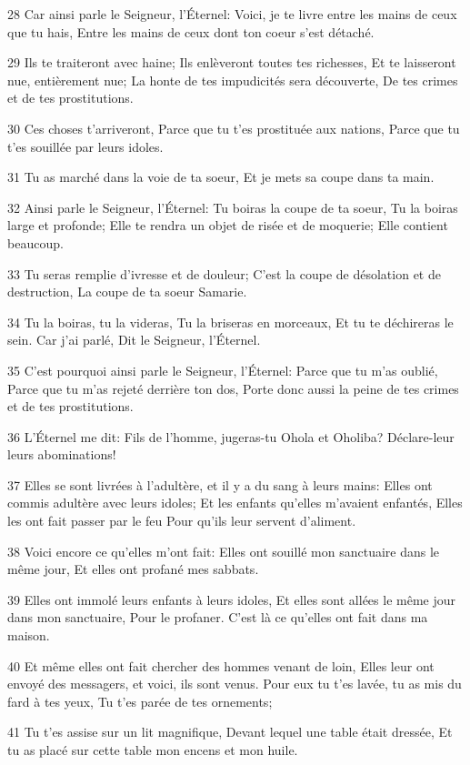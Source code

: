 \par 28 Car ainsi parle le Seigneur, l'Éternel: Voici, je te livre entre les mains de ceux que tu hais, Entre les mains de ceux dont ton coeur s'est détaché.
\par 29 Ils te traiteront avec haine; Ils enlèveront toutes tes richesses, Et te laisseront nue, entièrement nue; La honte de tes impudicités sera découverte, De tes crimes et de tes prostitutions.
\par 30 Ces choses t'arriveront, Parce que tu t'es prostituée aux nations, Parce que tu t'es souillée par leurs idoles.
\par 31 Tu as marché dans la voie de ta soeur, Et je mets sa coupe dans ta main.
\par 32 Ainsi parle le Seigneur, l'Éternel: Tu boiras la coupe de ta soeur, Tu la boiras large et profonde; Elle te rendra un objet de risée et de moquerie; Elle contient beaucoup.
\par 33 Tu seras remplie d'ivresse et de douleur; C'est la coupe de désolation et de destruction, La coupe de ta soeur Samarie.
\par 34 Tu la boiras, tu la videras, Tu la briseras en morceaux, Et tu te déchireras le sein. Car j'ai parlé, Dit le Seigneur, l'Éternel.
\par 35 C'est pourquoi ainsi parle le Seigneur, l'Éternel: Parce que tu m'as oublié, Parce que tu m'as rejeté derrière ton dos, Porte donc aussi la peine de tes crimes et de tes prostitutions.
\par 36 L'Éternel me dit: Fils de l'homme, jugeras-tu Ohola et Oholiba? Déclare-leur leurs abominations!
\par 37 Elles se sont livrées à l'adultère, et il y a du sang à leurs mains: Elles ont commis adultère avec leurs idoles; Et les enfants qu'elles m'avaient enfantés, Elles les ont fait passer par le feu Pour qu'ils leur servent d'aliment.
\par 38 Voici encore ce qu'elles m'ont fait: Elles ont souillé mon sanctuaire dans le même jour, Et elles ont profané mes sabbats.
\par 39 Elles ont immolé leurs enfants à leurs idoles, Et elles sont allées le même jour dans mon sanctuaire, Pour le profaner. C'est là ce qu'elles ont fait dans ma maison.
\par 40 Et même elles ont fait chercher des hommes venant de loin, Elles leur ont envoyé des messagers, et voici, ils sont venus. Pour eux tu t'es lavée, tu as mis du fard à tes yeux, Tu t'es parée de tes ornements;
\par 41 Tu t'es assise sur un lit magnifique, Devant lequel une table était dressée, Et tu as placé sur cette table mon encens et mon huile.
